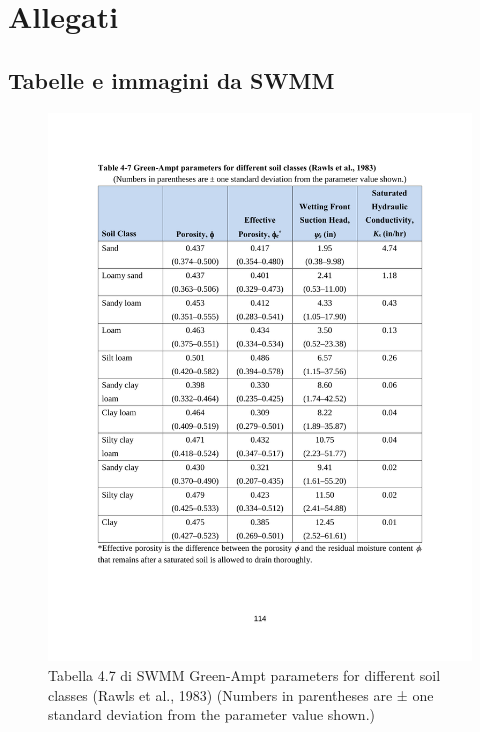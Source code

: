 \appendix
\chapter{Allegati}
\label{appendix:SWMM}
\section{Tabelle e immagini da SWMM}
\begin{figure}[H]
    \centering
    \includegraphics[trim=2.5cm 4.5cm 2.5cm 3.6cm,clip,width=\textwidth]{IMG/table4-7_Ks.pdf} 
    \caption[Tabella 4.7 di SWMM]{Tabella 4.7 di SWMM Green-Ampt parameters for different soil classes (Rawls et al., 1983) (Numbers in parentheses are ± one standard deviation from the parameter value shown.)}
    \label{SWMM:tabella4-7}
\end{figure}

